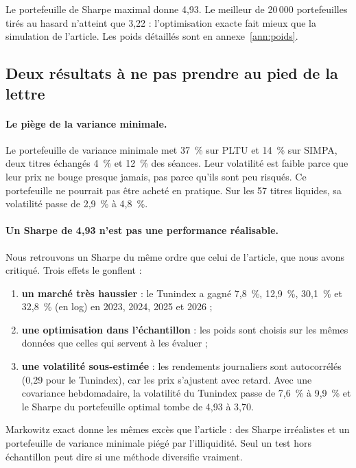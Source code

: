 \documentclass[11pt,a4paper]{article}
\newcommand{\pc}{~\%}
\begin{document}
Le portefeuille de Sharpe maximal donne 4,93. Le meilleur de 20\,000 portefeuilles tirés au hasard n'atteint que 3,22 : l'optimisation exacte fait mieux que la simulation de l'article. Les poids détaillés sont en annexe~\ref{ann:poids}.

\subsection{Deux résultats à ne pas prendre au pied de la lettre}
\paragraph{Le piège de la variance minimale.} Le portefeuille de variance minimale met 37\pc{} sur PLTU et 14\pc{} sur SIMPA, deux titres échangés 4\pc{} et 12\pc{} des séances. Leur volatilité est faible parce que leur prix ne bouge presque jamais, pas parce qu'ils sont peu risqués. Ce portefeuille ne pourrait pas être acheté en pratique. Sur les 57 titres liquides, sa volatilité passe de 2,9\pc{} à 4,8\pc{}.

\paragraph{Un Sharpe de 4,93 n'est pas une performance réalisable.} Nous retrouvons un Sharpe du même ordre que celui de l'article, que nous avons critiqué. Trois effets le gonflent :
\begin{enumerate}
  \item \textbf{un marché très haussier} : le Tunindex a gagné 7,8\pc{}, 12,9\pc{}, 30,1\pc{} et 32,8\pc{} (en log) en 2023, 2024, 2025 et 2026 ;
  \item \textbf{une optimisation dans l'échantillon} : les poids sont choisis sur les mêmes données que celles qui servent à les évaluer ;
  \item \textbf{une volatilité sous-estimée} : les rendements journaliers sont autocorrélés (0,29 pour le Tunindex), car les prix s'ajustent avec retard. Avec une covariance hebdomadaire, la volatilité du Tunindex passe de 7,6\pc{} à 9,9\pc{} et le Sharpe du portefeuille optimal tombe de 4,93 à 3,70.
\end{enumerate}

\begin{retenir}
Markowitz exact donne les mêmes excès que l'article : des Sharpe irréalistes et un portefeuille de variance minimale piégé par l'illiquidité. Seul un test hors échantillon peut dire si une méthode diversifie vraiment.
\end{retenir}
\end{document}

